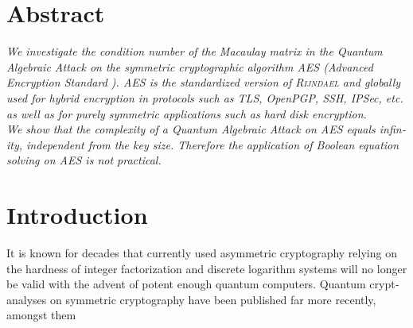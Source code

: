 \documentclass[a4paper,11pt]{article}
\begin{document}
\begin{otherlanguage}{english}

\vspace{3mm}



\section{Abstract}

\noindent
\textit{We investigate the condition number of the Macaulay matrix in the Quantum Algebraic Attack \cite{QAA} on the symmetric cryptographic algorithm \textsc{AES} (Advanced Encryption Standard \cite{AES}). \textsc{AES} is the standardized version of \textsc{Rijndael} and globally used for hybrid encryption in protocols such as TLS, OpenPGP, SSH, IPSec, etc. as well as for purely symmetric applications such as hard disk encryption.} \\

\noindent
\textit{We show that the complexity of a Quantum Algebraic Attack on \textsc{AES} equals infinity, independent from the key size. Therefore the application of Boolean equation solving \cite{QAA} on \textsc{AES} is not practical.} \\


\section{Introduction}

\noindent
It is known for decades that currently used asymmetric cryptography relying on the hardness of integer factorization and discrete logarithm systems will no longer be valid with the advent of potent enough quantum computers. Quantum cryptanalyses on symmetric cryptography have been published far more recently, amongst them \\


\end{otherlanguage}
\end{document}
